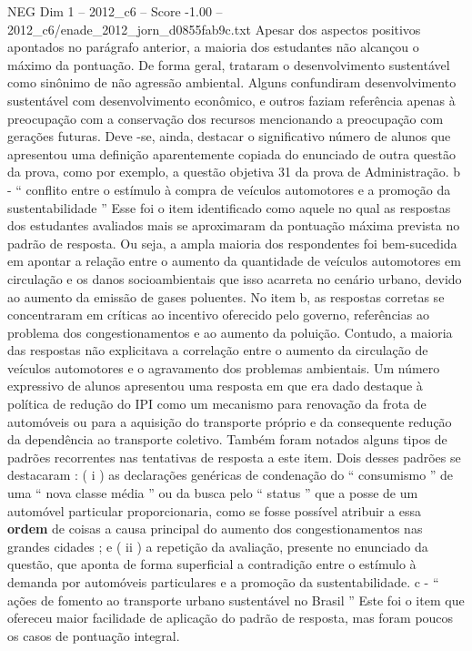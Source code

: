 \begin{textsample}{NEG Dim 1 – 2012\_c6 – Score -1.00 – 2012\_c6/enade\_2012\_jorn\_d0855fab9c.txt}
Apesar dos aspectos positivos apontados no parágrafo anterior, a maioria dos estudantes não alcançou o máximo da pontuação.
De forma geral, trataram o desenvolvimento sustentável como sinônimo de não agressão ambiental.
Alguns confundiram desenvolvimento sustentável com desenvolvimento econômico, e outros faziam referência apenas à preocupação com a conservação dos recursos mencionando a preocupação com gerações futuras.
Deve -se, ainda, destacar o significativo número de alunos que apresentou uma definição aparentemente copiada do enunciado de outra questão da prova, como por exemplo, a questão objetiva 31 da prova de Administração. b - “ conflito entre o estímulo à compra de veículos automotores e a promoção da sustentabilidade ” Esse foi o item identificado como aquele no qual as respostas dos estudantes avaliados mais se aproximaram da pontuação máxima prevista no padrão de resposta.
Ou seja, a ampla maioria dos respondentes foi bem-sucedida em apontar a relação entre o aumento da quantidade de veículos automotores em circulação e os danos socioambientais que isso acarreta no cenário urbano, devido ao aumento da emissão de gases poluentes.
No item b, as respostas corretas se concentraram em críticas ao incentivo oferecido pelo governo, referências ao problema dos congestionamentos e ao aumento da poluição.
Contudo, a maioria das respostas não explicitava a correlação entre o aumento da circulação de veículos automotores e o agravamento dos problemas ambientais.
Um número expressivo de alunos apresentou uma resposta em que era dado destaque à política de redução do IPI como um mecanismo para renovação da frota de automóveis ou para a aquisição do transporte próprio e da consequente redução da dependência ao transporte coletivo.
Também foram notados alguns tipos de padrões recorrentes nas tentativas de resposta a este item.
Dois desses padrões se destacaram : ( i ) as declarações genéricas de condenação do “ consumismo ” de uma “ nova classe média ” ou da busca pelo “ status ” que a posse de um automóvel particular proporcionaria, como se fosse possível atribuir a essa \textbf{ordem} de coisas a causa principal do aumento dos congestionamentos nas grandes cidades ; e ( ii ) a repetição da avaliação, presente no enunciado da questão, que aponta de forma superficial a contradição entre o estímulo à demanda por automóveis particulares e a promoção da sustentabilidade. c - “ ações de fomento ao transporte urbano sustentável no Brasil ” Este foi o item que ofereceu maior facilidade de aplicação do padrão de resposta, mas foram poucos os casos de pontuação integral.

\end{textsample}
